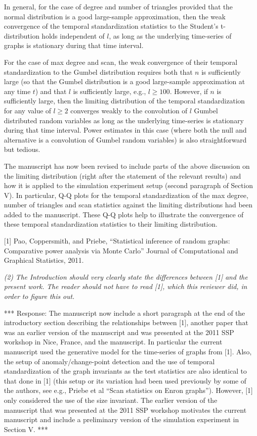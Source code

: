\documentclass{article}
\begin{document}
In general, for the case of degree and number of triangles provided
that the normal distribution is a good large-sample approximation,
then the weak convergence of the temporal standardization statistics
to the Student's t-distribution holds independent of $l$, as long as
the underlying time-series of graphs is stationary during that time
interval.

For the case of max degree and scan, the weak convergence of
their temporal standardization to the Gumbel distribution requires
both that $n$ is sufficiently large (so that the Gumbel distribution
is a good large-sample approximation at any time $t$) and that $l$ is
sufficiently large, e.g., $l \geq 100$. However, if $n$ is
sufficiently large, then the limiting distribution of the temporal
standardization for any value of $l \geq 2$ converges weakly to the
convolution of $l$ Gumbel distributed random variables as long as the
underlying time-series is stationary during that time interval. Power
estimates in this case (where both the null and alternative is a
convolution of Gumbel random variables) is also straightforward but tedious. 

The manuscript has now been revised to include parts of the above
discussion on the limiting distribution (right after the statement of
the relevant results) and how it is applied to the simulation
experiment setup (second paragraph of Section V). In particular, Q-Q
plots for the temporal standardization of the max degree, number of
triangles and scan statistics against the limiting distributions had
been added to the manuscript. These Q-Q plots help to illustrate the
convergence of these temporal standardization statistics to their
limiting distribution.

[1] Pao, Coppersmith, and Priebe, ``Statistical inference of random
graphs: Comparative power analysis via Monte Carlo'' Journal of
Computational and Graphical Statistics, 2011.

{\em (2) The Introduction should very clearly state the differences between [1]
and the present work. The reader should not have to read [1], which
this reviewer did, in order to figure this out.}

*** Response: The manuscript now include a short paragraph at the end
of the introductory section describing the relationships between [1],
another paper that was an earlier version of the manuscript and was
presented at the 2011 SSP workshop in Nice, France, and the
manuscript. In particular the current manuscript used the generative
model for the time-series of graphs from [1]. Also, the setup of
anomaly/change-point detection and the use of temporal standardization
of the graph invariants as the test statistics are also identical to
that done in [1] (this setup or its variation had been used previously
by some of the authors, see e.g., Priebe et al ``Scan statistics on
Enron graphs''). However, [1] only considered the use of the size
invariant. The earlier version of the manuscript that was presented at
the 2011 SSP workshop motivates the current manuscript and include a
preliminary version of the simulation experiment in Section V.  ***
\end{document}
